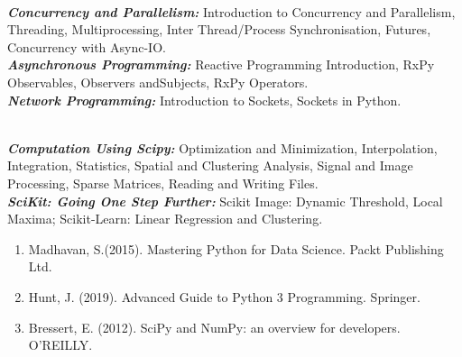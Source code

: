 \documentclass[12pt]{article}
\begin{document}
\vspace{0.3cm}

\vspace{0.1cm}\\
\textit{\textbf{Concurrency and Parallelism:}} Introduction to Concurrency and Parallelism, Threading, Multiprocessing, Inter Thread/Process Synchronisation, Futures, Concurrency with Async-IO.\\
\textit{\textbf{Asynchronous Programming:}} Reactive Programming Introduction, RxPy Observables, Observers andSubjects, RxPy Operators.\\
\textit{\textbf{Network Programming:}} Introduction to Sockets, Sockets in Python.

\vspace{0.3cm} 

\vspace{0.1cm}\\
\textit{\textbf{Computation Using Scipy:}} Optimization and Minimization, Interpolation, Integration, Statistics, Spatial and Clustering Analysis, Signal and Image Processing, Sparse Matrices, Reading and Writing Files.\\
\textit{\textbf{SciKit: Going One Step Further:}} Scikit Image: Dynamic Threshold, Local Maxima; Scikit-Learn: Linear Regression and Clustering.

\vspace{0.3cm} 


\vspace{0.3cm}


\begin{enumerate}[noitemsep,nolistsep, leftmargin=*]
    \item Madhavan, S.(2015). Mastering Python for Data Science. Packt Publishing Ltd.
    \item Hunt, J. (2019). Advanced Guide to Python 3 Programming. Springer.
    \item Bressert, E. (2012). SciPy and NumPy: an overview for developers.
O’REILLY.
\end{enumerate}
\end{document}
